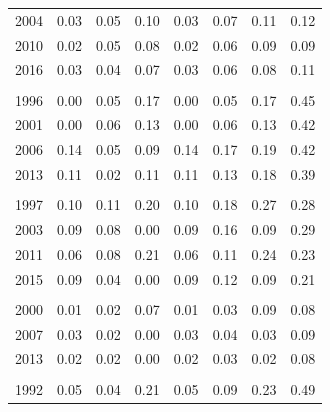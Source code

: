 \documentclass[
  11pt,
a4paper
]{article}
\begin{document}
\begin{longtable}[t]{rrrrrrrr}
\hspace{1em}2004 & 0.03 & 0.05 & 0.10 & 0.03 & 0.07 & 0.11 & 0.12\\
\hspace{1em}2010 & 0.02 & 0.05 & 0.08 & 0.02 & 0.06 & 0.09 & 0.09\\
\hspace{1em}2016 & 0.03 & 0.04 & 0.07 & 0.03 & 0.06 & 0.08 & 0.11\\
\addlinespace[0.3em]
\multicolumn{8}{l}{\textbf{Mali}}\\
\hspace{1em}1996 & 0.00 & 0.05 & 0.17 & 0.00 & 0.05 & 0.17 & 0.45\\
\hspace{1em}2001 & 0.00 & 0.06 & 0.13 & 0.00 & 0.06 & 0.13 & 0.42\\
\hspace{1em}2006 & 0.14 & 0.05 & 0.09 & 0.14 & 0.17 & 0.19 & 0.42\\
\hspace{1em}2013 & 0.11 & 0.02 & 0.11 & 0.11 & 0.13 & 0.18 & 0.39\\
\addlinespace[0.3em]
\multicolumn{8}{l}{\textbf{Mozambique}}\\
\hspace{1em}1997 & 0.10 & 0.11 & 0.20 & 0.10 & 0.18 & 0.27 & 0.28\\
\hspace{1em}2003 & 0.09 & 0.08 & 0.00 & 0.09 & 0.16 & 0.09 & 0.29\\
\hspace{1em}2011 & 0.06 & 0.08 & 0.21 & 0.06 & 0.11 & 0.24 & 0.23\\
\hspace{1em}2015 & 0.09 & 0.04 & 0.00 & 0.09 & 0.12 & 0.09 & 0.21\\
\addlinespace[0.3em]
\multicolumn{8}{l}{\textbf{Namibia}}\\
\hspace{1em}2000 & 0.01 & 0.02 & 0.07 & 0.01 & 0.03 & 0.09 & 0.08\\
\hspace{1em}2007 & 0.03 & 0.02 & 0.00 & 0.03 & 0.04 & 0.03 & 0.09\\
\hspace{1em}2013 & 0.02 & 0.02 & 0.00 & 0.02 & 0.03 & 0.02 & 0.08\\
\addlinespace[0.3em]
\multicolumn{8}{l}{\textbf{Niger}}\\
\hspace{1em}1992 & 0.05 & 0.04 & 0.21 & 0.05 & 0.09 & 0.23 & 0.49\\

\end{longtable}
\end{document}
